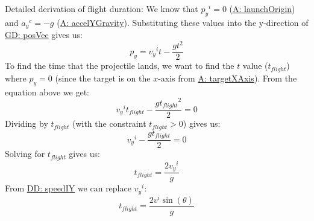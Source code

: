 \documentclass[12pt]{article}
\begin{document}
Detailed derivation of flight duration:
We know that ${{p_{y}}^{i}}=0$ (\hyperref[launchOrigin]{A: launchOrigin}) and ${{a_{y}}^{c}}=-g$ (\hyperref[accelYGravity]{A: accelYGravity}). Substituting these values into the y-direction of \hyperref[GD:posVec]{GD: posVec} gives us:
\begin{displaymath}
{p_{y}}={{v_{y}}^{i}} t-\frac{g t^{2}}{2}
\end{displaymath}
To find the time that the projectile lands, we want to find the $t$ value (${t_{flight}}$) where ${p_{y}}=0$ (since the target is on the $x$-axis from \hyperref[targetXAxis]{A: targetXAxis}). From the equation above we get:
\begin{displaymath}
{{v_{y}}^{i}} {t_{flight}}-\frac{g {t_{flight}}^{2}}{2}=0
\end{displaymath}
Dividing by ${t_{flight}}$ (with the constraint ${t_{flight}}>0$) gives us:
\begin{displaymath}
{{v_{y}}^{i}}-\frac{g {t_{flight}}}{2}=0
\end{displaymath}
Solving for ${t_{flight}}$ gives us:
\begin{displaymath}
{t_{flight}}=\frac{2 {{v_{y}}^{i}}}{g}
\end{displaymath}
From \hyperref[DD:speedIY]{DD: speedIY} we can replace ${{v_{y}}^{i}}$:
\begin{displaymath}
{t_{flight}}=\frac{2 {v^{i}} \sin\left(θ\right)}{g}
\end{displaymath}
\par~
\end{document}
